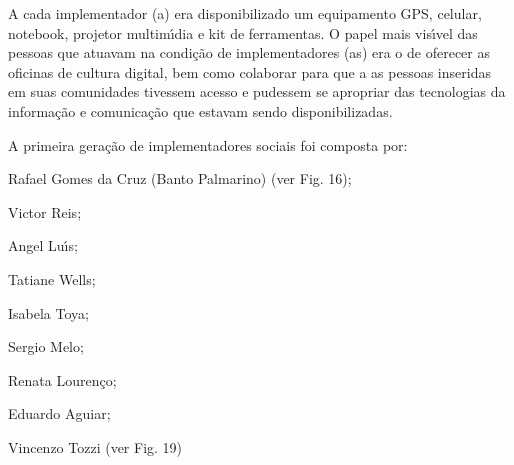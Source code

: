 \documentclass[
12pt,		%
openright,	%
twoside,  %
a4paper,			%
chapter=TITLE,		%
english,			%
french,				%
spanish,			%
brazil				%
]{USPSC-classe/USPSC}
\begin{document}
A cada implementador (a) era disponibilizado um equipamento GPS, celular, notebook, projetor multim\'{\i}dia e kit de ferramentas. O papel mais vis\'{\i}vel das pessoas que atuavam na condi\c{c}\~ao de implementadores (as) era o de oferecer as oficinas de cultura digital, bem como colaborar para que a as pessoas inseridas em suas comunidades tivessem acesso e pudessem se apropriar das tecnologias da informa\c{c}\~ao e comunica\c{c}\~ao que estavam sendo disponibilizadas.


















\noindent\begin{center}\mbox{\centering{}}\end{center}


A  primeira gera\c{c}\~ao de implementadores  sociais foi composta por:


















\begin{alineas}
\item Rafael Gomes da Cruz (Banto Palmarino) (ver Fig. 16);
\item Victor Reis;
\item Angel Lu\'{\i}s;
\item Tatiane Wells;
\item Isabela Toya;
\item Sergio Melo;
\item Renata Louren\c{c}o;
\item Eduardo Aguiar;
\item Vincenzo Tozzi (ver Fig. 19)
\end{alineas}
\end{document}
